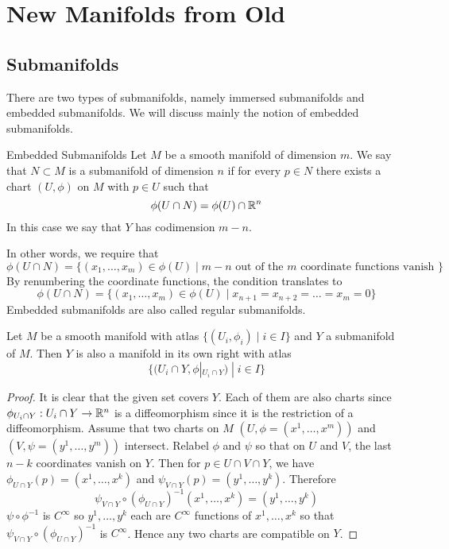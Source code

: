 \documentclass[a4paper]{article}
\begin{document}
\pagebreak
\section{New Manifolds from Old}
\subsection{Submanifolds}
There are two types of submanifolds, namely immersed submanifolds and embedded submanifolds. We will discuss mainly the notion of embedded submanifolds. 

\begin{defn}{Embedded Submanifolds}{} Let $M$ be a smooth manifold of dimension $m$. We say that $N\subset M$ is a submanifold of dimension $n$ if for every $p\in N$ there exists a chart $(U,\phi)$ on $M$ with $p\in U$ such that $$\phi(U\cap N)=\phi(U)\cap\mathbb{R}^n$$ 
In this case we say that $Y$ has codimension $m-n$. 
\end{defn}

In other words, we require that $$\phi(U\cap N)=\{(x_1,\dots,x_m)\in\phi(U)\;|\;m-n\text{ out of the }m\text{ coordinate functions vanish }\}$$ By renumbering the coordinate functions, the condition translates to $$\phi(U\cap N)=\{(x_1,\dots,x_m)\in\phi(U)\;|\;x_{n+1}=x_{n+2}=\dots=x_m=0\}$$ Embedded submanifolds are also called regular submanifolds. 

\begin{prp}{}{} Let $M$ be a smooth manifold with atlas $\{(U_i,\phi_i)\;|\;i\in I\}$ and $Y$ a submanifold of $M$. Then $Y$ is also a manifold in its own right with atlas $$\{(U_i\cap Y,\phi|_{U_i\cap Y})\;|\;i\in I\}$$\tcbline
\begin{proof}
It is clear that the given set covers $Y$. Each of them are also charts since $\phi_{U_i\cap Y}:U_i\cap Y\to\mathbb{R}^n$ is a diffeomorphism since it is the restriction of a diffeomorphism. Assume that two charts on $M$ $(U,\phi=(x^1,\dots,x^m))$ and $(V,\psi=(y^1,\dots,y^m))$ intersect. Relabel $\phi$ and $\psi$ so that on $U$ and $V$, the last $n-k$ coordinates vanish on $Y$. Then for $p\in U\cap V\cap Y$, we have $\phi_{U\cap Y}(p)=(x^1,\dots,x^k)$ and $\psi_{V\cap Y}(p)=(y^1,\dots,y^k)$. Therefore $$\psi_{V\cap Y}\circ(\phi_{U\cap Y})^{-1}(x^1,\dots,x^k)=(y^1,\dots,y^k)$$ $\psi\circ\phi^{-1}$ is $C^\infty$ so $y^1,\dots,y^k$ each are $C^\infty$ functions of $x^1,\dots,x^k$ so that $\psi_{V\cap Y}\circ(\phi_{U\cap Y})^{-1}$ is $C^\infty$. Hence any two charts are compatible on $Y$. 
\end{proof}
\end{prp}
\end{document}
